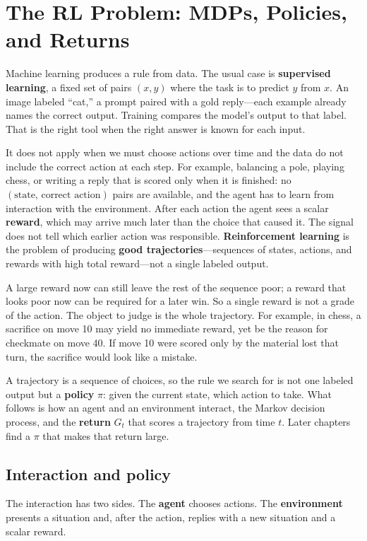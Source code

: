 \chapter{The RL Problem: MDPs, Policies, and Returns}

Machine learning produces a rule from data. The usual case is \textbf{supervised learning}, a fixed set of pairs $(x,y)$ where the task is to predict $y$ from $x$. An image labeled ``cat,'' a prompt paired with a gold reply---each example already names the correct output. Training compares the model's output to that label. That is the right tool when the right answer is known for each input.

It does not apply when we must choose actions over time and the data do not include the correct action at each step. For example, balancing a pole, playing chess, or writing a reply that is scored only when it is finished: no $(\text{state},\,\text{correct action})$ pairs are available, and the agent has to learn from interaction with the environment. After each action the agent sees a scalar \textbf{reward}, which may arrive much later than the choice that caused it. The signal does not tell which earlier action was responsible. \textbf{Reinforcement learning} is the problem of producing \textbf{good trajectories}---sequences of states, actions, and rewards with high total reward---not a single labeled output.

A large reward now can still leave the rest of the sequence poor; a reward that looks poor now can be required for a later win. So a single reward is not a grade of the action. The object to judge is the whole trajectory. For example, in chess, a sacrifice on move 10 may yield no immediate reward, yet be the reason for checkmate on move 40. If move 10 were scored only by the material lost that turn, the sacrifice would look like a mistake.

A trajectory is a sequence of choices, so the rule we search for is not one labeled output but a \textbf{policy} $\pi$: given the current state, which action to take. What follows is how an agent and an environment interact, the Markov decision process, and the \textbf{return} $G_t$ that scores a trajectory from time $t$. Later chapters find a $\pi$ that makes that return large.

\section{Interaction and policy}
The interaction has two sides. The \textbf{agent} chooses actions. The \textbf{environment} presents a situation and, after the action, replies with a new situation and a scalar reward.

